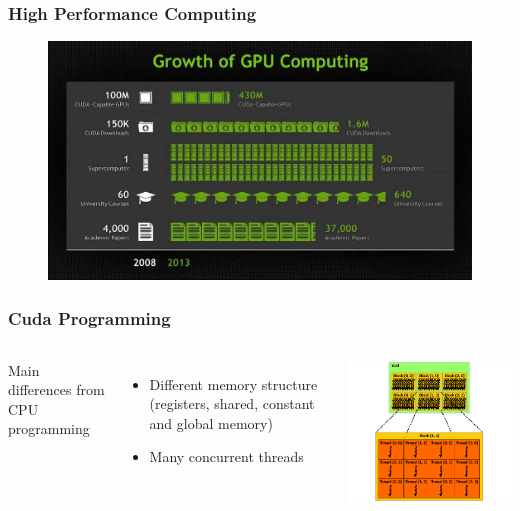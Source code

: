 \documentclass[xcolor=table]{beamer}
\begin{document}
	\begin{frame}
		\frametitle{High Performance Computing}
				\begin{figure}
					\centering
					\includegraphics[scale=0.25]{Resources/gpuEvo.jpg}
				\end{figure}
	\end{frame}
	\begin{frame}
		\frametitle{Cuda Programming}
		\begin{columns}
		\column{0.5\textwidth}
		Main differences from CPU programming
		\begin{itemize}
			\item Different memory structure (registers, shared, constant and global memory)
			\item Many concurrent threads
		\end{itemize}

		\column{0.5\textwidth}
		\centering
			\includegraphics[scale=0.6]{Resources/grid-of-thread-blocks.png}
	\end{columns}
	\end{frame}
\end{document}
